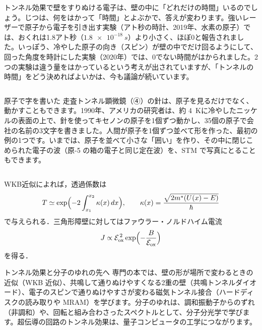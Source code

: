 \begin{phmada}
トンネル効果で壁をすりぬける電子は、壁の中に「どれだけの時間」いるのでしょう。じつは、何をはかって「時間」とよぶかで、答えが変わります。強いレーザーで原子から電子を引き出す実験（アト秒の時計、2019年、水素の原子）では、おくれは1.8アト秒（$\qty{1.8e-18}{s}$）より小さく、ほぼ0と報告されました。いっぽう、冷やした原子の向き（スピン）が壁の中でだけ回るようにして、回った角度を時計にした実験（2020年）では、0でない時間がはかられました。2つの実験は違う量をはかっているという考えが出されていますが、「トンネルの時間」をどう決めればよいかは、今も議論が続いています。
\end{phmada}

\begin{column}{原子で字を書いた}
走査トンネル顕微鏡（④）の針は、原子を見るだけでなく、動かすこともできます。1990年、アメリカの研究者は、約 \qty{4}{K}に冷やしたニッケルの表面の上で、針を使ってキセノンの原子を1個ずつ動かし、35個の原子で会社の名前の3文字を書きました。人間が原子を1個ずつ並べて形を作った、最初の例の1つです。いまでは、原子を並べて小さな「囲い」を作り、その中に閉じこめられた電子の波（原-5 の箱の電子と同じ定在波）を、STM で写真にとることもできます。
\end{column}

\begin{senmonsho}[半導体工学の専門書の書き方]
\begin{bkhonbun}
WKB近似によれば，透過係数は\[T\simeq\exp\Bigl(-2\int_{x_1}^{x_2}\kappa(x)\,dx\Bigr),\qquad \kappa(x)=\frac{\sqrt{2m^*(U(x)-E)}}{\hbar}\]で与えられる．三角形障壁に対してはファウラー・ノルドハイム電流\[J\propto\mathcal E_{\mathrm{ox}}^{\,2}\exp\Bigl(-\frac{B}{\mathcal E_{\mathrm{ox}}}\Bigr)\]を得る．
\end{bkhonbun}
\end{senmonsho}

\begin{phsaki}{トンネル効果と分子のゆれの先へ}
専門の本では、壁の形が場所で変わるときの近似（WKB 近似）、共鳴して通りぬけやすくなる2重の壁（共鳴トンネルダイオード）、電子のスピンで通りぬけやすさが変わる磁気トンネル接合（ハードディスクの読み取りや MRAM）を学びます。分子のゆれは、調和振動子からのずれ（非調和）や、回転と組み合わさったスペクトルとして、分子分光学で学びます。超伝導の回路のトンネル効果は、量子コンピュータの工学につながります。
\end{phsaki}


